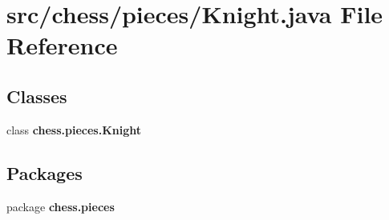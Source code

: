 \section{src/chess/pieces/\+Knight.java File Reference}
\label{_knight_8java}
\subsection*{Classes}
\begin{DoxyCompactItemize}
\item 
class {\bf chess.\+pieces.\+Knight}
\end{DoxyCompactItemize}
\subsection*{Packages}
\begin{DoxyCompactItemize}
\item 
package {\bf chess.\+pieces}
\end{DoxyCompactItemize}
